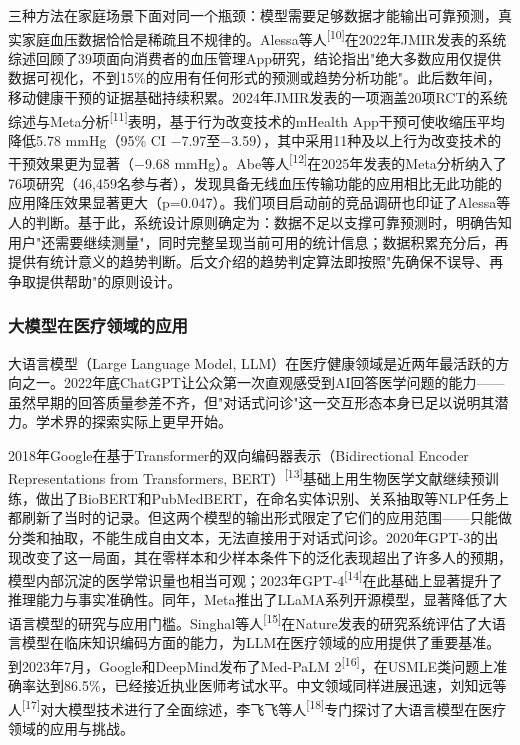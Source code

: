 \documentclass[zihao=-4,a4paper]{ctexart}
\begin{document}
三种方法在家庭场景下面对同一个瓶颈：模型需要足够数据才能输出可靠预测，真实家庭血压数据恰恰是稀疏且不规律的。Alessa等人\textsuperscript{[10]}在2022年JMIR发表的系统综述回顾了39项面向消费者的血压管理App研究，结论指出"绝大多数应用仅提供数据可视化，不到15\%的应用有任何形式的预测或趋势分析功能"。此后数年间，移动健康干预的证据基础持续积累。2024年JMIR发表的一项涵盖20项RCT的系统综述与Meta分析\textsuperscript{[11]}表明，基于行为改变技术的mHealth App干预可使收缩压平均降低5.78 mmHg（95\% CI $-$7.97至$-$3.59），其中采用11种及以上行为改变技术的干预效果更为显著（$-$9.68 mmHg）。Abe等人\textsuperscript{[12]}在2025年发表的Meta分析纳入了76项研究（46,459名参与者），发现具备无线血压传输功能的应用相比无此功能的应用降压效果显著更大（p=0.047）。我们项目启动前的竞品调研也印证了Alessa等人的判断。基于此，系统设计原则确定为：数据不足以支撑可靠预测时，明确告知用户"还需要继续测量"，同时完整呈现当前可用的统计信息；数据积累充分后，再提供有统计意义的趋势判断。后文介绍的趋势判定算法即按照"先确保不误导、再争取提供帮助"的原则设计。

\subsubsection{大模型在医疗领域的应用}

大语言模型（Large Language Model, LLM）在医疗健康领域是近两年最活跃的方向之一。2022年底ChatGPT让公众第一次直观感受到AI回答医学问题的能力——虽然早期的回答质量参差不齐，但"对话式问诊"这一交互形态本身已足以说明其潜力。学术界的探索实际上更早开始。

2018年Google在基于Transformer的双向编码器表示（Bidirectional Encoder Representations from Transformers, BERT）\textsuperscript{[13]}基础上用生物医学文献继续预训练，做出了BioBERT和PubMedBERT，在命名实体识别、关系抽取等NLP任务上都刷新了当时的记录。但这两个模型的输出形式限定了它们的应用范围——只能做分类和抽取，不能生成自由文本，无法直接用于对话式问诊。2020年GPT-3的出现改变了这一局面，其在零样本和少样本条件下的泛化表现超出了许多人的预期，模型内部沉淀的医学常识量也相当可观；2023年GPT-4\textsuperscript{[14]}在此基础上显著提升了推理能力与事实准确性。同年，Meta推出了LLaMA系列开源模型，显著降低了大语言模型的研究与应用门槛。Singhal等人\textsuperscript{[15]}在Nature发表的研究系统评估了大语言模型在临床知识编码方面的能力，为LLM在医疗领域的应用提供了重要基准。到2023年7月，Google和DeepMind发布了Med-PaLM 2\textsuperscript{[16]}，在USMLE类问题上准确率达到86.5\%，已经接近执业医师考试水平。中文领域同样进展迅速，刘知远等人\textsuperscript{[17]}对大模型技术进行了全面综述，李飞飞等人\textsuperscript{[18]}专门探讨了大语言模型在医疗领域的应用与挑战。
\end{document}
